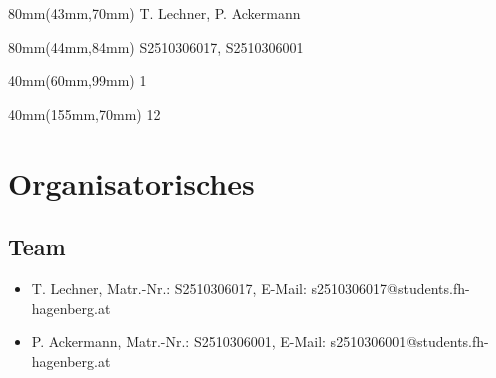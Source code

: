 

\newcommand{\docproject}{Fahrsimulation}			%
\newcommand{\docsubject}{Software Design Patterns}	%
\newcommand{\docsubjectshort}{SDP3}					%
\newcommand{\docexercise}{Übung 5}					%
\newcommand{\docauthor}{T. Lechner}					%
\newcommand{\doccoauthor}{P. Ackermann}				%
\newcommand{\docauthornumber}{S2510306017}			%
\newcommand{\doccoauthornumber}{S2510306001}		%
\newcommand{\docauthoremail}{s2510306017@students.fh-hagenberg.at}
\newcommand{\doccoauthoremail}{s2510306001@students.fh-hagenberg.at}
\newcommand{\docdate}{\date}						%
\newcommand{\docsemester}{Wintersemester 2026/2027}	%




\begin{textblock*}{80mm}(43mm,70mm)
	\docauthor, \doccoauthor
\end{textblock*}
\begin{textblock*}{80mm}(44mm,84mm)
	\docauthornumber, \doccoauthornumber
\end{textblock*}
\begin{textblock*}{40mm}(60mm,99mm)
	1 					%
\end{textblock*}
\begin{textblock*}{40mm}(155mm,70mm)
	12					%
\end{textblock*}


\newpage
\hgbtitle
\newpage



\tableofcontents
\newpage


\section{Organisatorisches}

\subsection{Team}
\begin{itemize}
	\item \docauthor, Matr.-Nr.: \docauthornumber, E-Mail: \docauthoremail	
	\item \doccoauthor, Matr.-Nr.: \doccoauthornumber, E-Mail: \doccoauthoremail
\end{itemize}

